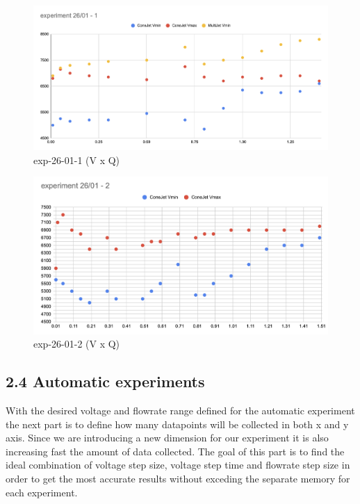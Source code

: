         \begin{figure}[H]
            \center
            \includegraphics[width=12cm]{joao_26-01-22/exp-26-01-1.png}
            \caption{ exp-26-01-1 (V x Q)}
        \end{figure}

        \begin{figure}[H]
            \center
            \includegraphics[width=12cm]{joao_26-01-22/exp26-01-2.png}
            \caption{ exp-26-01-2 (V x Q)}
        \end{figure}


\subsection*{2.4 Automatic experiments}

    With the desired voltage and flowrate range defined for the automatic experiment the next part is to define how many datapoints will be collected in both
    x and y axis. Since we are introducing a new dimension for our experiment it is also increasing fast the amount of data collected.
    The goal of this part is to find the ideal combination of voltage step size, voltage step time and flowrate step size in order to get the most accurate results without exceding the separate memory for each experiment.
    
